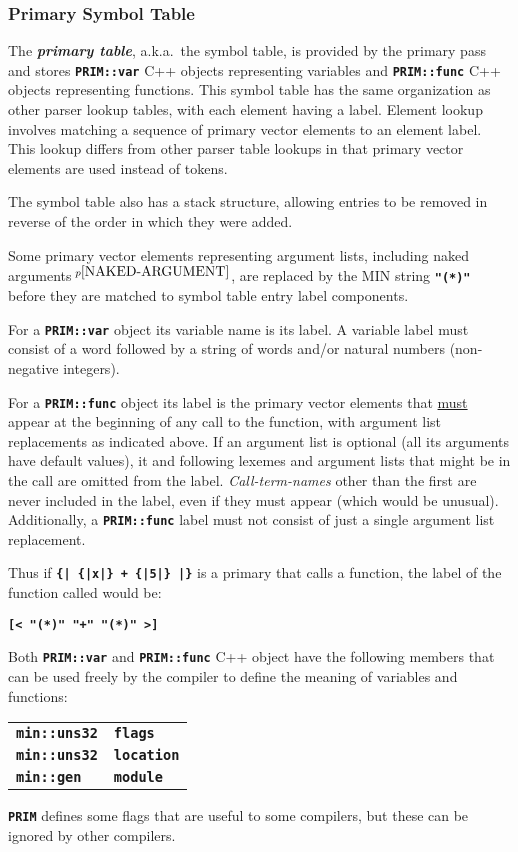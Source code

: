 \documentclass[12pt]{article}
\newcommand{\TT}[1]{{\tt \bfseries #1}}
\newcommand{\key}[1]{{\bf \em #1}\index{#1}}
\newcommand{\pagnote}[1]{$\,^{p\pageref{#1}}$}
\begin{document}
\subsubsection{Primary Symbol Table}

The \key{primary table}, a.k.a.~the symbol table, is provided by the
primary pass and stores
\TT{PRIM::var} C++ objects representing variables and
\TT{PRIM::func} C++ objects representing functions.
This symbol table has the same organization as other parser
lookup tables, with each element having a label.  Element
lookup involves matching a sequence of primary vector elements
to an element label.
This lookup differs from other parser table
lookups in that primary vector elements are used instead
of tokens.

The symbol table also has a stack structure, allowing entries
to be removed in reverse of the order in which they were added.

Some primary vector elements representing argument lists, including
naked arguments\pagnote{NAKED-ARGUMENT}, are replaced
by the MIN string \TT{"(*)"} before they are matched to
symbol table entry label components.

For a \TT{PRIM::var} object its variable name is its label.
A variable label must consist of a word followed by
a string of words and/or natural numbers (non-negative integers).

For a \TT{PRIM::func} object its label is the primary vector
elements that \underline{must} appear at the beginning of any call to
the function, with argument list replacements as indicated above.
If an argument list is optional (all its
arguments have default values), it and following lexemes and
argument lists that might be in the call are omitted from the label.
{\em Call-term-names} other than the first are never included in the label,
even if they must appear (which would be unusual).
Additionally, a \TT{PRIM::func} label must not consist of just a single
argument list replacement.

Thus if \TT{\{| \{|x|\} + \{|5|\} |\}} is a primary that calls
a function, the label of the function called would be: \\
\centerline{\TT{[< "(*)" "+" "(*)" >]}}

Both \TT{PRIM::var} and \TT{PRIM::func} C++ object have the following
members that can be used freely by the compiler to define the
meaning of variables and functions:
\begin{center}
\begin{tabular}{ll}
\TT{min::uns32} & \TT{flags} \\
\TT{min::uns32} & \TT{location} \\
\TT{min::gen}   & \TT{module} \\
\end{tabular}
\end{center}
\TT{PRIM} defines some flags that are useful to some compilers,
but these can be ignored by other compilers.
\end{document}
